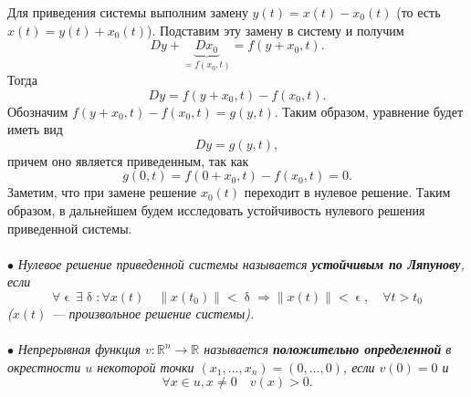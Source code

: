 \documentclass[a4paper, 12pt]{report}
\newcommand{\Rm}{\mathbb{R}}
\renewcommand{\delta}{\updelta}
\renewcommand{\epsilon}{\upvarepsilon}
\newcommand\Norm[1]{\left\| #1 \right\|}
\begin{document}
	Для приведения системы выполним замену $y(t) = x(t) - x_0(t)$ (то есть $x(t) = y(t) + x_0(t)$). Подставим эту замену в систему и получим $$Dy + \underbrace{Dx_0}_{=f(x_0, t)} = f(y + x_0, t).$$
	Тогда $$Dy = f(y+x_0, t) - f(x_0,t).$$
	Обозначим $f(y+x_0, t) - f(x_0,t) = g(y,t)$. Таким образом, уравнение будет иметь вид $$Dy = g(y,t),$$
	причем оно является приведенным, так как $$g(0,t) = f(0+x_0,t) - f(x_0,t) = 0.$$
	Заметим, что при замене решение $x_0(t)$ переходит в нулевое решение. Таким образом, в дальнейшем будем исследовать устойчивость нулевого решения приведенной системы.\\\\
	$\bullet$ \textit{Нулевое решение приведенной системы называется \textbf{устойчивым по Ляпунову}, если} $$\forall \epsilon\ \exists \delta : \forall x(t)\quad \Norm{x(t_0)} < \delta \Rightarrow \Norm{x(t)} < \epsilon,\quad \forall t > t_0$$
	\textit{($x(t)$ --- произвольное решение системы).}\\\\
	$\bullet$ \textit{Непрерывная функция $v : \Rm^n \rightarrow \Rm$ называется \textbf{положительно определенной} в окрестности $u$ некоторой точки $(x_1,\ldots, x_n) = (0,\ldots, 0)$, если $v(0) = 0$ и} $$\forall x \in u, x \ne 0\quad v(x) > 0.$$
\end{document}

